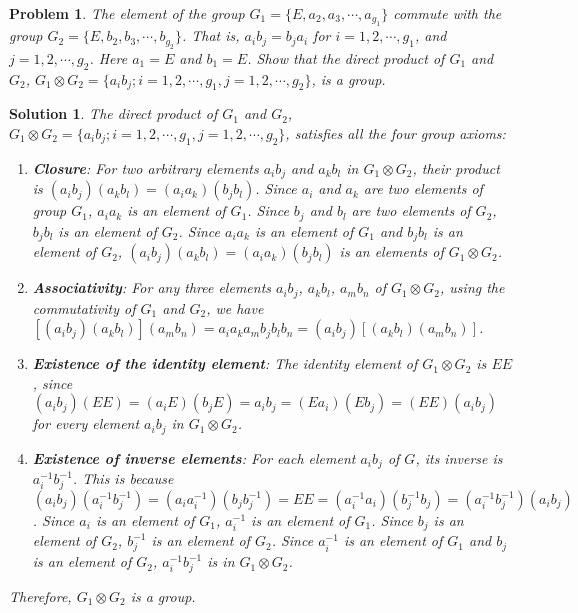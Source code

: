 \documentclass[UTF8,10pt,a4paper]{article}
\theoremstyle{Problem}
\newtheorem{prob}{Problem}
\theoremstyle{Solution}
\newtheorem*{sol}{Solution}
\begin{document}
\thispagestyle{FirstPageStyle}
\begin{prob}
    The element of the group $G_1=\{E,a_2,a_3,\cdots,a_{g_1}\}$ commute with the group $G_2=\{E,b_2,b_3,\cdots,b_{g_2}\}$. That is, $a_ib_j=b_ja_i$ for $i=1,2,\cdots,g_1$, and $j=1,2,\cdots,g_2$. Here $a_1=E$ and $b_1=E$. Show that the direct product of $G_1$ and $G_2$, $G_1\otimes G_2=\{a_ib_j;i=1,2,\cdots,g_1,j=1,2,\cdots,g_2\}$, is a group.
\end{prob}
\begin{sol}
    The direct product of $G_1$ and $G_2$, $G_1\otimes G_2=\{a_ib_j;i=1,2,\cdots,g_1,j=1,2,\cdots,g_2\}$, satisfies all the four group axioms:
    \begin{enumerate}
        \item \textbf{Closure}: For two arbitrary elements $a_ib_j$ and $a_kb_l$ in $G_1\otimes G_2$, their product is $(a_ib_j)(a_kb_l)=(a_ia_k)(b_jb_l)$. Since $a_i$ and $a_k$ are two elements of group $G_1$, $a_ia_k$ is an element of $G_1$. Since $b_j$ and $b_l$ are two elements of $G_2$, $b_jb_l$ is an element of $G_2$. Since $a_ia_k$ is an element of $G_1$ and $b_jb_l$ is an element of $G_2$, $(a_ib_j)(a_kb_l)=(a_ia_k)(b_jb_l)$ is an elements of $G_1\otimes G_2$.
        \item \textbf{Associativity}: For any three elements $a_ib_j$, $a_kb_l$, $a_mb_n$ of $G_1\otimes G_2$, using the commutativity of $G_1$ and $G_2$, we have $[(a_ib_j)(a_kb_l)](a_mb_n)=a_ia_ka_mb_jb_lb_n=(a_ib_j)[(a_kb_l)(a_mb_n)]$.
        \item \textbf{Existence of the identity element}: The identity element of $G_1\otimes G_2$ is $EE$, since $(a_ib_j)(EE)=(a_iE)(b_jE)=a_ib_j=(Ea_i)(Eb_j)=(EE)(a_ib_j)$ for every element $a_ib_j$ in $G_1\otimes G_2$.
        \item \textbf{Existence of inverse elements}: For each element $a_ib_j$ of $G$, its inverse is $a_i^{-1}b_j^{-1}$. This is because $(a_ib_j)(a_i^{-1}b_j^{-1})=(a_ia_i^{-1})(b_jb_j^{-1})=EE=(a_i^{-1}a_i)(b_j^{-1}b_j)=(a_i^{-1}b_j^{-1})(a_ib_j)$. Since $a_i$ is an element of $G_1$, $a_i^{-1}$ is an element of $G_1$. Since $b_j$ is an element of $G_2$, $b_j^{-1}$ is an element of $G_2$. Since $a_i^{-1}$ is an element of $G_1$ and $b_j$ is an element of $G_2$, $a_i^{-1}b_j^{-1}$ is in $G_1\otimes G_2$.
    \end{enumerate}
    Therefore, $G_1\otimes G_2$ is a group.
\end{sol}
\end{document}
